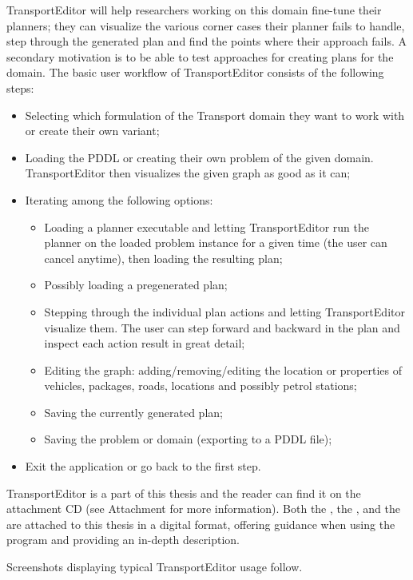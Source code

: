 TransportEditor will help researchers working on this domain fine-tune their planners; they can visualize the various corner cases their planner fails to handle, step through the generated plan and find the points where their approach fails.
A secondary motivation is to be able to test approaches for creating plans for the domain.
The basic user workflow of TransportEditor consists of the following steps:
\begin{itemize}
\item Selecting which formulation of the Transport domain they want to work with or create their own variant;
\item Loading the PDDL or creating their own problem of the given domain. TransportEditor then visualizes the given graph as good as it can;
\item Iterating among the following options:
\begin{itemize}
\item Loading a planner executable and letting TransportEditor run the planner on the loaded problem instance for a given time (the user can cancel anytime),
then loading the resulting plan;
\item Possibly loading a pregenerated plan;
\item Stepping through the individual plan actions and letting TransportEditor visualize them.
The user can step forward and backward in the plan and inspect each action result in great detail;
\item Editing the graph: adding/removing/editing the location or properties of vehicles, packages, roads, locations and possibly petrol stations;
\item Saving the currently generated plan;
\item Saving the problem or domain (exporting to a PDDL file);
\end{itemize}
\item Exit the application or go back to the first step.
\end{itemize}

TransportEditor is a part of this thesis and the reader can find it on the attachment CD (see Attachment  for more information). Both the ,
the , and the  are attached to this thesis in a digital format, offering guidance when
using the program and providing an in-depth description.

Screenshots displaying typical TransportEditor usage follow.

